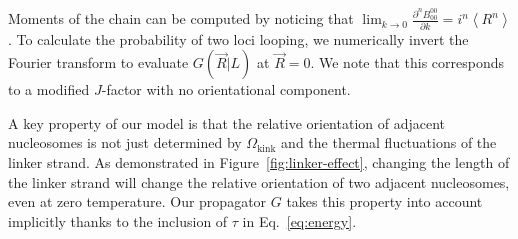 \documentclass[%
 reprint,
superscriptaddress,
showpacs,preprintnumbers,
 amsmath,amssymb,
 aps,
 prl,
]{revtex4-1}
\newcommand{\greens}[2][\Omega_0; L]{G(#2|#1)}
\begin{document}
Moments of the chain can be computed by noticing that
    $\lim_{k\to0} \frac{\partial^n B_{00}^{00}}{\partial k} = i^n \left\langle
    R^n\right\rangle$.
To calculate the probability of two loci looping, we numerically invert
    the Fourier transform to evaluate $\greens[L]{\vec{R}}$ at $\vec{R} = 0$.
We note that this corresponds to a modified $J$-factor with no orientational
    component.

A key property of our model is that the relative orientation of adjacent
    nucleosomes is not just determined by $\Omega_\text{kink}$ and the thermal
    fluctuations of the linker strand.
As demonstrated in Figure~\ref{fig:linker-effect}, changing the length of the
    linker strand will change the relative orientation of two adjacent
    nucleosomes, even at zero temperature.
Our propagator $G$ takes this property into account implicitly thanks to the
    inclusion of $\tau$ in Eq.~\ref{eq:energy}.



\begin{figure*}[th]
    \begin{centering}
    \end{centering}
    \caption{\protect{} Zero-temperature structure vs. Monte Carlo simulation
    snapshot of nucleosome chain with \SI{38}{\basepair} linkers.
    \protect{} The Kuhn lengths of homogenous chains are
    \SI{10.5}{\basepair} periodic in linker length, with each linker length
    representing a distinct, discretized helical WLC\@. In the limit of long
    linkers, the Kuhn length eventually approaches that of bare DNA,
    \SI{100}{\nano\metre}. \protect{} Compact, superhelical
    structures afford more flexibility than non-compact fibres, which have
    higher Kuhn lengths. Thus, the overall structure of chromatin is extremely
    sensitive to changes in the nucleosome repeat length.}\label{fig:homo-kuhn}
\end{figure*}
\end{document}
